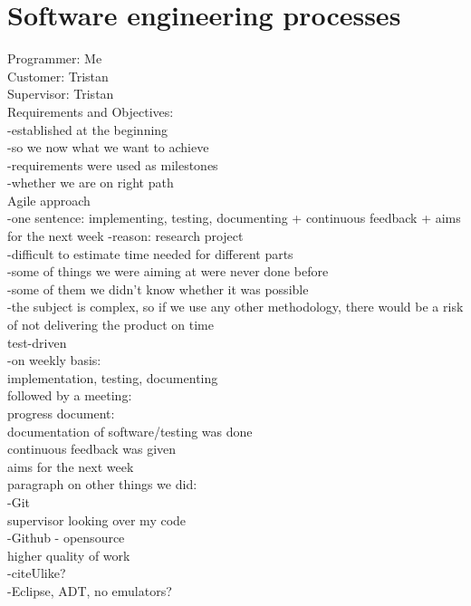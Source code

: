 \section{Software engineering processes}
\label{s:processes}
Programmer: Me\\	
Customer: Tristan\\
Supervisor: Tristan\\

Requirements and Objectives:\\
	-established at the beginning\\
		-so we now what we want to achieve\\
	-requirements were used as milestones\\
		-whether we are on right path\\

Agile approach\\
	-one sentence: implementing, testing, documenting + continuous feedback + aims for the next week
	-reason: research project\\
		-difficult to estimate time needed for different parts\\
			-some of things we were aiming at were never done before\\
			-some of them we didn't know whether it was possible\\
		-the subject is complex, so if we use any other methodology, there would be a risk of not delivering the product on time\\
		test-driven\\
			
	-on weekly basis:\\
		implementation, testing, documenting\\
		followed by a meeting:\\
			progress document:\\
				documentation of software/testing was done\\
			continuous feedback was given\\
			aims for the next week\\
			
paragraph on other things we did:\\
	-Git\\
		supervisor looking over my code\\
	-Github - opensource\\
		higher quality of work\\
	-citeUlike?\\
	-Eclipse, ADT, no emulators?\\
	